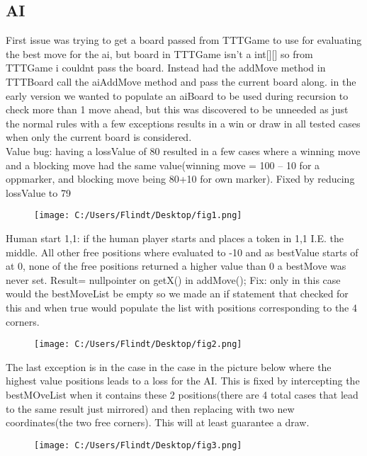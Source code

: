 \documentclass[a4paper,10pt]{article}
\begin{document}
	\subsection{AI}
	First issue was trying to get a board passed from TTTGame to use for evaluating the best move for the ai, but board in TTTGame isn’t a int[][] so from TTTGame i couldnt pass the board. Instead had the addMove method in TTTBoard call the aiAddMove method and pass the current board along.
	in the early version we wanted to populate an aiBoard to be used during recursion to check more than 1 move ahead, but this was discovered to be unneeded as just the normal rules with a few exceptions results in a win or draw in all tested cases when only the current board is considered.\\
	
	Value bug: having a lossValue of 80 resulted in a few cases where a winning move and a blocking move had the same value(winning move = 100 – 10 for a oppmarker, and blocking move being 80+10 for own marker). 
	Fixed by reducing lossValue to 79
	
	\begin{figure}[H]\center
		\texttt{[image: C:/Users/Flindt/Desktop/fig1.png]}
		\caption{}
	\end{figure}	
	
	
	Human start 1,1: if the human player starts and places a token in 1,1 I.E. the middle. All other free positions where evaluated to -10 and as bestValue starts of at 0, none of the free positions returned a higher value than 0 a bestMove was never set. Result= nullpointer on getX() in addMove();
	Fix: only in this case would the bestMoveList be empty so we made an if statement that checked for this and when true would populate the list with positions corresponding to the 4 corners.
	\begin{figure}[H]\center
		\texttt{[image: C:/Users/Flindt/Desktop/fig2.png]}
		\caption{}
	\end{figure}	
	The last exception is in the case in the case in the picture below where the highest value positions leads to a loss for the AI. This is fixed by intercepting the bestMOveList when it contains these 2 positions(there are 4 total cases that lead to the same result just mirrored) and then replacing with two new coordinates(the two free corners). This will at least guarantee a draw. 
	\begin{figure}[H]\center
		\texttt{[image: C:/Users/Flindt/Desktop/fig3.png]}
		\caption{}
	\end{figure}
\end{document}
